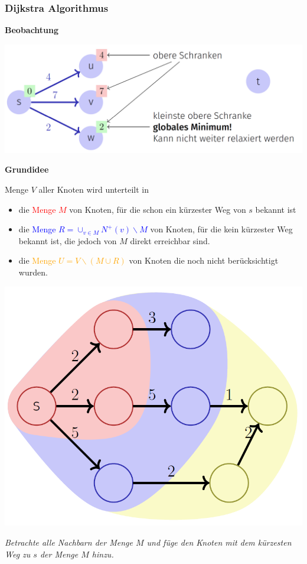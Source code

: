 \begin{sectionbox}
\subsubsection{Dijkstra Algorithmus}\smallskip
\textbf{Beobachtung}\par
\begin{center}
    \includegraphics[width = 0.85\columnwidth]{../img/DijkstraBeobachtung.png}\par
\end{center}\smallskip

\textbf{Grundidee}\par
Menge $V$ aller Knoten wird unterteilt in
\begin{itemize}
    \item die \textcolor{red}{Menge $M$} von Knoten, für die schon ein kürzester Weg von $s$ bekannt ist
    \item die \textcolor{blue}{Menge $R=\cup_{v \in M} N^{+}(v) \backslash M$} von Knoten, für die kein kürzester Weg bekannt ist, die jedoch von $M$ direkt erreichbar sind.
    \item die \textcolor{orange}{Menge $U=V \backslash(M \cup R)$} von Knoten die noch nicht berücksichtigt wurden.
\end{itemize}

\begin{center}
    \includegraphics[width = 0.35\columnwidth]{../img/DijkstraSym.png}\par
\end{center}
\textit{Betrachte alle Nachbarn der Menge $M$ und füge den Knoten mit dem kürzesten Weg zu $s$ der Menge $M$ hinzu.}\par
\end{sectionbox}
